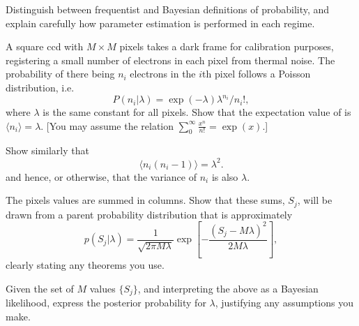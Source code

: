 \documentclass[compose]{exam-n}
\begin{document}
\begin{question}{30} 
Distinguish between frequentist and Bayesian definitions of
probability, and explain carefully how parameter estimation is
performed in each regime.

A square ccd with $M\times M$ pixels takes a dark frame for
calibration purposes, registering a small number of electrons in
each pixel from thermal noise. The probability of there being $n_i$
electrons in the $i$th pixel follows a Poisson distribution, i.e.
\begin{equation*}
 P(n_i|\lambda) = \exp(-\lambda)\lambda^{n_i}/n_i!,
\end{equation*}
where $\lambda$ is the same constant for all pixels. Show that the
expectation value of  is $\langle n_i \rangle = \lambda$.
 [You may assume the relation $\sum_0^\infty \frac{x^n}{n!}=\exp(x)$.]

Show similarly that
\begin{equation*}
 \langle n_i(n_i-1) \rangle = \lambda^2.
\end{equation*}
and hence, or otherwise, that the variance of $n_i$ is also
$\lambda$.

The pixels values are summed in columns.  Show that these sums,
$S_j$, will be drawn from a parent probability distribution that is
approximately
\begin{equation*} p(S_j|\lambda)=\frac{1}{\sqrt{2\pi
M\lambda}}\exp\left[-\frac{(S_j-M\lambda)^2}{2M\lambda}\right],
\end{equation*}
clearly stating any theorems you use.

Given the set of $M$ values $\{S_j\}$, and interpreting the above
as a Bayesian likelihood, express the posterior probability for
$\lambda$, justifying any assumptions you make.
\end{question}
\end{document}
